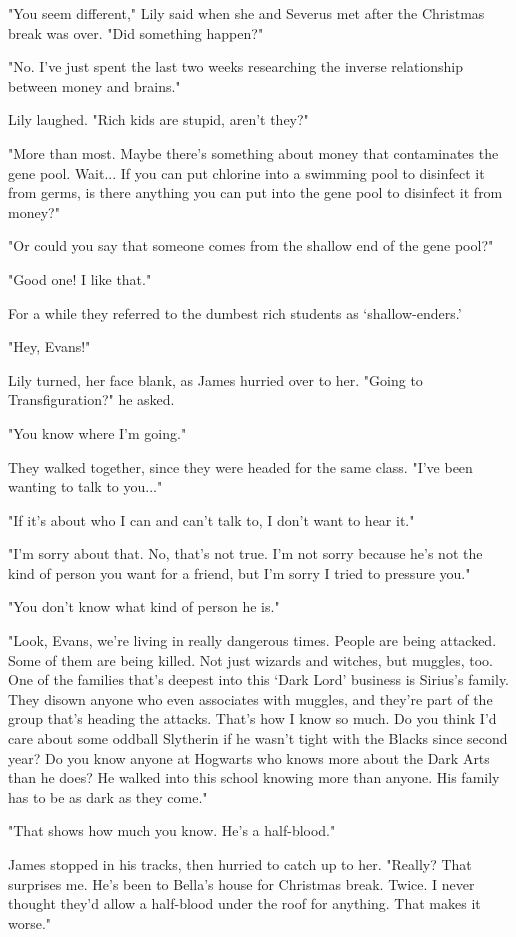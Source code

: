 "You seem different," Lily said when she and Severus met after the Christmas break was over. "Did something happen?"

"No. I've just spent the last two weeks researching the inverse relationship between money and brains."

Lily laughed. "Rich kids are stupid, aren't they?"

"More than most. Maybe there's something about money that contaminates the gene pool. Wait... If you can put chlorine into a swimming pool to disinfect it from germs, is there anything you can put into the gene pool to disinfect it from money?"

"Or could you say that someone comes from the shallow end of the gene pool?"

"Good one! I like that."

For a while they referred to the dumbest rich students as `shallow-enders.'

"Hey, Evans!"

Lily turned, her face blank, as James hurried over to her. "Going to Transfiguration?" he asked.

"You know where I'm going."

They walked together, since they were headed for the same class. "I've been wanting to talk to you..."

"If it's about who I can and can't talk to, I don't want to hear it."

"I'm sorry about that. No, that's not true. I'm not sorry because he's not the kind of person you want for a friend, but I'm sorry I tried to pressure you."

"You don't know what kind of person he is."

"Look, Evans, we're living in really dangerous times. People are being attacked. Some of them are being killed. Not just wizards and witches, but muggles, too. One of the families that's deepest into this `Dark Lord' business is Sirius's family. They disown anyone who even associates with muggles, and they're part of the group that's heading the attacks. That's how I know so much. Do you think I'd care about some oddball Slytherin if he wasn't tight with the Blacks since second year? Do you know anyone at Hogwarts who knows more about the Dark Arts than he does? He walked into this school knowing more than anyone. His family has to be as dark as they come."

"That shows how much you know. He's a half-blood."

James stopped in his tracks, then hurried to catch up to her. "Really? That surprises me. He's been to Bella's house for Christmas break. Twice. I never thought they'd allow a half-blood under the roof for anything. That makes it worse."

